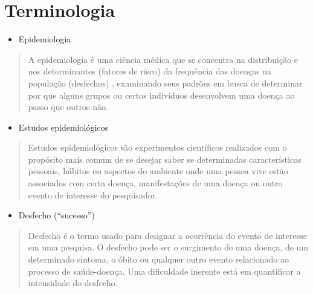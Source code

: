 \documentclass[
]{book}
\providecommand{\tightlist}{%
  \setlength{\itemsep}{0pt}\setlength{\parskip}{0pt}}
\begin{document}
\hfill\break

\hypertarget{terminologia}{%
\section{Terminologia}\label{terminologia}}

\hfill\break

\begin{itemize}
\tightlist
\item
  Epidemiologia
\end{itemize}

\hfill\break

\begin{quote}
A epidemiologia é uma ciência médica que se concentra na distribuição e nos determinantes (fatores de risco) da frequência das doenças na população (desfechos) , examinando seus padrões em busca de determinar por que alguns grupos ou certos indivíduos desenvolvem uma doença ao passo que outros não.
\end{quote}

\hfill\break

\begin{itemize}
\tightlist
\item
  Estudos epidemiológicos
\end{itemize}

\hfill\break

\begin{quote}
Estudos epidemiológicos são experimentos científicos realizados com o propósito mais comum de se desejar saber se determinadas características pessoais, hábitos ou aspectos do ambiente onde uma pessoa vive estão associados com certa doença, manifestações de uma doença ou outro evento de interesse do pesquisador.
\end{quote}

\hfill\break

\begin{itemize}
\tightlist
\item
  Desfecho (``sucesso'')
\end{itemize}

\hfill\break

\begin{quote}
Desfecho é o termo usado para designar a ocorrência do evento de interesse em uma pesquisa. O desfecho pode ser o surgimento de uma doença, de um determinado sintoma, o óbito ou qualquer outro evento relacionado ao processo de saúde-doença. Uma dificuldade inerente está em quantificar a intensidade do desfecho.
\end{quote}
\end{document}
